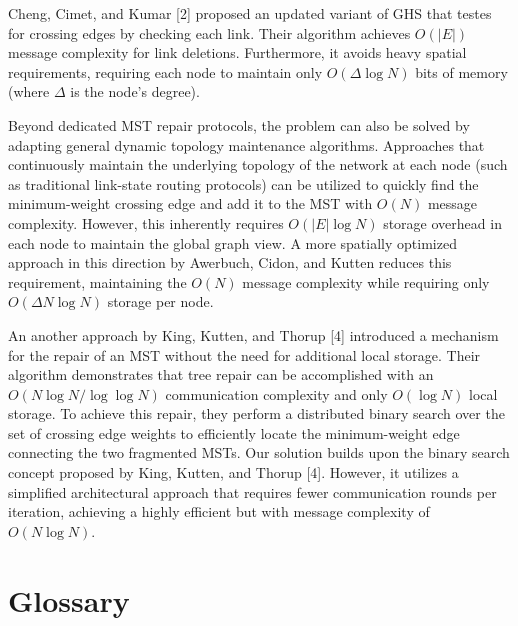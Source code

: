 \documentclass{memoir}
\begin{document}
Cheng, Cimet, and Kumar [2] proposed an updated variant of GHS that testes for crossing edges by checking each link. Their algorithm achieves $O(|E|)$ message complexity for link deletions. Furthermore, it avoids heavy spatial requirements, requiring each node to maintain only $O(\Delta \log N)$ bits of memory (where $\Delta$ is the node's degree).

Beyond dedicated MST repair protocols, the problem can also be solved by adapting general dynamic topology maintenance algorithms. Approaches that continuously maintain the underlying topology of the network at each node (such as traditional link-state routing protocols) can be utilized to quickly find the minimum-weight crossing edge and add it to the MST with $O(N)$ message complexity. However, this inherently requires $O(|E| \log N)$ storage overhead in each node to maintain the global graph view. A more spatially optimized approach in this direction by Awerbuch, Cidon, and Kutten reduces this requirement, maintaining the $O(N)$ message complexity while requiring only $O(\Delta N \log N)$ storage per node.

An another approach by King, Kutten, and Thorup [4] introduced a mechanism for the repair of an MST without the need for additional local storage. Their algorithm demonstrates that tree repair can be accomplished with an $O(N \log N / \log \log N)$ communication complexity and only $O(\log N)$ local storage. To achieve this repair, they perform a distributed binary search over the set of crossing edge weights to efficiently locate the minimum-weight edge connecting the two fragmented MSTs. Our solution builds upon the binary search concept proposed by King, Kutten, and Thorup [4]. However, it utilizes a simplified architectural approach that requires fewer communication rounds per iteration, achieving a highly efficient but with message complexity of $O(N \log N)$.



\section{Glossary}
\end{document}
